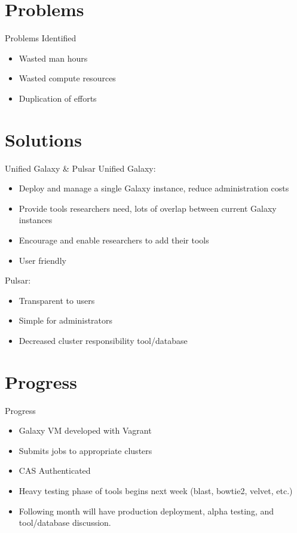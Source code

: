 \documentclass[]{beamer}
\begin{document}
\section{Problems}
\begin{frame}{Problems Identified}
\begin{itemize}
\item
  Wasted man hours
\item
  Wasted compute resources
\item
  Duplication of efforts
\end{itemize}
\end{frame}


\section{Solutions}
\begin{frame}{Unified Galaxy \& Pulsar}
Unified Galaxy:
\begin{itemize}
\item
    Deploy and manage a single Galaxy instance, reduce administration costs
\item
    Provide tools researchers need, lots of overlap between current Galaxy instances
\item
    Encourage and enable researchers to add their tools
\item
    User friendly
\end{itemize}
Pulsar:
\begin{itemize}
\item
    Transparent to users
\item
    Simple for administrators
\item
    Decreased cluster responsibility tool/database
\end{itemize}
\end{frame}


\section{Progress}
\begin{frame}{Progress}
\begin{itemize}
\item
    Galaxy VM developed with Vagrant
\item
    Submits jobs to appropriate clusters
\item
    CAS Authenticated
\pause
\item
    Heavy testing phase of tools begins next week (blast, bowtie2, velvet, etc.)
\item
    Following month will have production deployment, alpha testing, and tool/database discussion.
\end{itemize}
\end{frame}
\end{document}
